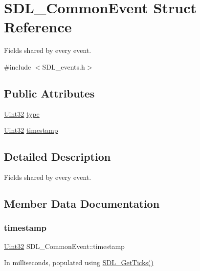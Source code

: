 \hypertarget{struct_s_d_l___common_event}{}\section{S\+D\+L\+\_\+\+Common\+Event Struct Reference}
\label{struct_s_d_l___common_event}


Fields shared by every event.  




{\ttfamily \#include $<$S\+D\+L\+\_\+events.\+h$>$}

\subsection*{Public Attributes}
\begin{DoxyCompactItemize}
\item 
\hyperlink{_s_d_l__stdinc_8h_add440eff171ea5f55cb00c4a9ab8672d}{Uint32} \hyperlink{struct_s_d_l___common_event_a4ecd888325355321b42b2e2956f27453}{type}
\item 
\hyperlink{_s_d_l__stdinc_8h_add440eff171ea5f55cb00c4a9ab8672d}{Uint32} \hyperlink{struct_s_d_l___common_event_a7d9046abb021ffc88dd5d32978289e65}{timestamp}
\end{DoxyCompactItemize}


\subsection{Detailed Description}
Fields shared by every event. 

\subsection{Member Data Documentation}
\mbox{\label{struct_s_d_l___common_event_a7d9046abb021ffc88dd5d32978289e65}} 
\subsubsection{\texorpdfstring{timestamp}{timestamp}}
{\footnotesize\ttfamily \hyperlink{_s_d_l__stdinc_8h_add440eff171ea5f55cb00c4a9ab8672d}{Uint32} S\+D\+L\+\_\+\+Common\+Event\+::timestamp}

In milliseconds, populated using \hyperlink{_s_d_l__timer_8h_a0b9bc71d6287e0ffafdc3419760fe2b3}{S\+D\+L\+\_\+\+Get\+Ticks()} \mbox{\label{struct_s_d_l___common_event_a4ecd888325355321b42b2e2956f27453}} 
